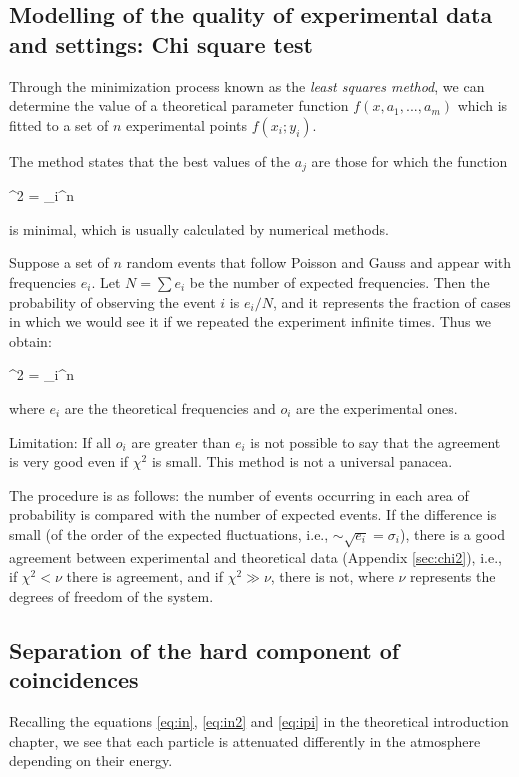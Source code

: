 	\subsection{Modelling of the quality of experimental data and settings: Chi square test}

Through the minimization process known as the \textit{least squares method}, we can determine the value of a theoretical parameter function $f(x, a_1, ..., a_m)$ which is fitted to a set of $n$ experimental points $f (x_i; y_i)$.

The method states that the best values ​​of the $a_j$ are those for which the function


	\be\chi^2 = \sum_i^n\ee

is minimal, which is usually calculated by numerical methods.

Suppose a set of $n$ random events that follow Poisson and Gauss and appear with frequencies $e_i$. Let $N = \sum e_i$ be the number of expected frequencies. Then the probability of observing the event $i$ is $e_i/N$, and it represents the fraction of cases in which we would see it if we repeated the experiment infinite times. Thus we obtain:

			\noindent\be\chi^2 = \sum_i^n\ee

where $e_i$ are the theoretical frequencies and $o_i$ are the experimental ones.

Limitation: If all $o_i$ are greater than $e_i$ is not possible to say that the agreement is very good even if $\chi^2$ is small. This method is not a universal panacea.

The procedure is as follows: the number of events occurring in each area of probability is compared with the number of expected events. If the difference is small (of the order of the expected fluctuations, i.e., $\sim \sqrt{e_i} = \sigma_i$), there is a good agreement between experimental and theoretical data (Appendix \ref{sec:chi2}), i.e., if $\chi^2 < \nu$ there is agreement, and if $\chi^2 \gg \nu$, there is not, where $\nu$ represents the degrees of freedom of the system.



\subsection{Separation of the hard component of coincidences}\label{sub:separation}


Recalling the equations \ref{eq:in}, \ref{eq:in2} and \ref{eq:ipi} in the  theoretical introduction chapter, we see that each particle is attenuated differently in the atmosphere depending on their energy.

